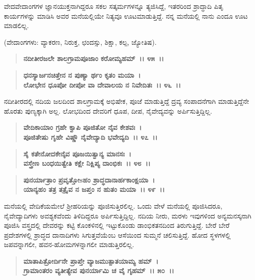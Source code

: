 ವೇದವೇದಾಂಗಗಳ ಜ್ಞಾನಯುಕ್ತನಾಗಿದ್ದರೂ ಸಕಲ ಸತ್ಕರ್ಮಗಳನ್ನೂ ತ್ಯಜಿಸಿದ್ದೆ, ಇತರರಿಂದ ಶ್ರಾದ್ಧಾದಿ ಪಿತೃ ಕಾರ್ಯಗಳನ್ನು ಮಾಡಿಸಿ ಅವರ ಮನೆಯಲ್ಲಿಯೇ ನಿತ್ಯವೂ ಊಟಮಾಡುತ್ತಿದ್ದೆ. ನನ್ನ ಮನೆಯಲ್ಲಿ ನಾನು ಎಂದೂ ಊಟ ಮಾಡಲಿಲ್ಲ.

(ವೇದಾಂಗಗಳು: ವ್ಯಾಕರಣ, ನಿರುಕ್ತ, ಛಂದಸ್ಸು, ಶಿಕ್ಷಾ, ಕಲ್ಪ, ಜ್ಯೋತಿಷ).

\begin{verse}
\textbf{ನದೀತೀರಜಲೇ ಶಾಲಗ್ರಾಮಪೂಜಾಂ ಕರೋಮ್ಯಹಮ್~।। ೪೫~।।} 
\end{verse}

\begin{verse}
\textbf{ಧನಸ್ಯಾರ್ಜನಚಿತ್ತೇನ ನ ಪುಣ್ಯಾ ರ್ಥಂ ಕೃತಂ ಮಯಾ~।}\\\textbf{ಲೋಭೇನ ಧೂಪೋ ದೀಪೋ ವಾ ದೇವಾಲಯ ನ ನಿವೇದಿತಃ~।। ೪೬~।।}
\end{verse}

ನದೀತೀರದಲ್ಲಿ ನದಿಯ ಜಲದಿಂದ ಶಾಲಗ್ರಾಮಕ್ಕೆ ಅಭಿಷೇಕ, ಪೂಜೆ ಮಾಡುತ್ತಿದ್ದೆ ದ್ರವ್ಯ ಸಂಪಾದನೆಗಾಗಿ ಮಾಡುತ್ತಿದ್ದೆನೇ ಹೊರತು ಪುಣ್ಯಕ್ಕಾಗಿ ಅಲ್ಲ. ಲೋಭದಿಂದ ದೇವರಿಗೆ ಧೂಪ, ದೀಪ, ನೈವೇದ್ಯವನ್ನು ಅರ್ಪಿಸುತ್ತಿದ್ದಿಲ್ಲ.

\begin{verse}
\textbf{ವೇದಿಕಾಯಾಂ ಗ್ರಹೇ ಕ್ವಾಪಿ ಪೂಜಿತೋ ನೈವ ಕೇಶವಃ~।}\\\textbf{ಪೂಜಿತೇಷು ಗೃಹೇ ವಿಷ್ಣೌ ನೈವೇದ್ಯಾದಿ ಭವೇದ್ಯದಿ~।। ೪೭~।। }
\end{verse}

\begin{verse}
\textbf{ಸೈ ಕತೇನೋದಕೇನೈವ ಪೂಜಯಿತ್ವಾನ್ಯ ಮಾನಸಃ~।}\\\textbf{ವಸ್ತ್ರೇಣ ಬಂಧಯಿತ್ವೇತಿ ಕಕ್ಷೇ ನಿಕ್ಷಿಪ್ಯ ದಾಂಭಿಕಃ~।। ೪೮~।। }
\end{verse}

\begin{verse}
\textbf{ಪುನರ್ಯಾತ್ರಾಂ ಪ್ರವೃತ್ತೋsಹಂ ಶ್ರಾದ್ಧದಾನಾರ್ಹಕಾಂಕ್ಷಯಾ~।}\\\textbf{ಯಾನ್ಯಹಂ ತತ್ರ ತತ್ರೈವ ನ ಜಪ್ತಂ ನ ಹುತಂ ಮಯಾ~।। ೪೯~।।}
\end{verse}

ಮನೆಯಲ್ಲಿ ವೇದಿಕೆಯಮೇಲೆ ಶ‍್ರೀಹರಿಯನ್ನು ಪೂಜಿಸುತ್ತಿರಲಿಲ್ಲ. ಒಂದು ವೇಳೆ ಮನೆಯಲ್ಲಿ ಪೂಜಿಸಿದರೂ, ನೈವೇದ್ಯಾದಿಗಳು ಅವಶ್ಯಕವೆಂದು ತಿಳಿದಿದ್ದರೂ ಅರ್ಪಿಸುತ್ತಿದ್ದಿಲ್ಲ. ನದಿಯ ನೀರು, ಮರಳು ಇವುಗಳಿಂದ ಅನ್ಯಮನಸ್ಕನಾಗಿ ಪೂಜಿಸಿ ವಸ್ತ್ರದಲ್ಲಿ ದೇವರನ್ನು ಕಟ್ಟಿ ಕೊಂಕಳಿನಲ್ಲಿ ಇಟ್ಟುಕೊಂಡು ಡಾಂಭಿಕತನದಿಂದ ತಿರುಗುತ್ತಿದ್ದೆ. ಬೇರೆ ಬೇರೆ ಪ್ರದೇಶಗಳಲ್ಲಿ ಶ್ರಾದ್ಧದ ದಾನಾದಿಗಳು ಸಿಗುತ್ತವೆಯೆಂಬ ಆಸೆಯಿಂದ ಸುಮ್ಮನೆ ಚಲಿಸುತ್ತಿದ್ದೆ. ಹೋದ ಸ್ಥಳಗಳಲ್ಲಿ ಜಪವನ್ನಾಗಲೀ, ಹವನ-ಹೋಮಗಳನ್ನಾಗಲೀ ಮಾಡುತ್ತಿರಲಿಲ್ಲ.

\begin{verse}
\textbf{ಮಾತಾಪಿತ್ರೋರ್ದಿನೇ ಪ್ರಾಪ್ತೇ ವ್ಯಾಜಮುತ್ಪಾತಯಾಮ್ಯ ಹಮ್~।}\\\textbf{ಗ್ರಾಮಾಂತರಂ ವ್ಯತೀತ್ಯೇವ ಪುನರ್ಯಾಮಿ ಚ ವೈ ಗೃಹಮ್~।। ೫೦~।।} 
\end{verse}

